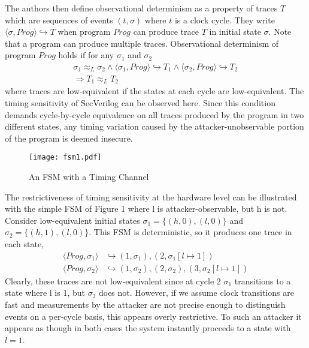 \documentclass[paper=a4, fontsize=10pt]{scrartcl} %
\begin{document}
The authors then define observational determinism as a property of traces $T$ 
which are sequences of events $(t,\sigma)$ where $t$ is a clock cycle. They 
write $\langle \sigma, Prog\rangle \hookrightarrow T$ when program $Prog$ can 
produce trace $T$ in initial state $\sigma$. Note that a program can produce 
multiple traces. Observational determinism of program $Prog$ holds if for any 
$\sigma_1$ and $\sigma_2$
\begin{align}
    \sigma_1 \approx_L \sigma_2 \wedge \langle\sigma_1,Prog\rangle \hookrightarrow T_1
    \wedge \langle\sigma_2,Prog\rangle \hookrightarrow T_2 \\
    \Longrightarrow T_1 \approx_L T_2
\end{align}
where traces are low-equivalent if the states at each cycle are low-equivalent.
The timing sensitivity of SecVerilog can be observed here. Since this condition 
demands cycle-by-cycle equivalence on all traces produced by the program in two 
different states, any timing variation caused by the attacker-unobservable 
portion of the program is deemed insecure.

\begin{figure}
    \begin{center}
        \texttt{[image: fsm1.pdf]}
        \caption{An FSM with a Timing Channel}
        \label{fig:fsm1}
    \end{center}
\end{figure}

The restrictiveness of timing sensitivity at the hardware level can be 
illustrated with the simple FSM of Figure 1 where l is attacker-observable, but 
h is not. Consider 
low-equivalent initial states $\sigma_1=\{(h,0),(l,0)\}$ and
$\sigma_2=\{(h,1),(l,0)\}$. This FSM is deterministic, so it produces one trace 
in each state,
\begin{align*}
\langle Prog, \sigma_1 \rangle &\hookrightarrow
(1, \sigma_1), (2, \sigma_1[l\mapsto1]) \\
\langle Prog, \sigma_2 \rangle &\hookrightarrow
(1, \sigma_2), (2, \sigma_2), (3, \sigma_2[l\mapsto1])
\end{align*}
Clearly, these traces are not low-equivalent since at cycle 2 $\sigma_1$ transitions to 
a state where l is 1, but $\sigma_2$ does not. However, if we assume clock 
transitions are fast and measurements by the attacker are not precise enough to 
distinguish events on a per-cycle basis, this appears overly restrictive. To 
such an attacker it appears as though in both cases the system instantly 
proceeds to a state with $l=1$.
\end{document}
